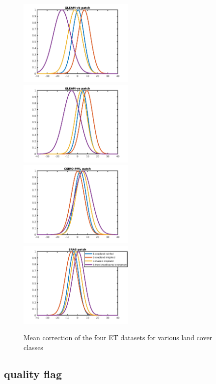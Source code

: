 \documentclass[draft]{agujournal2019}
\begin{document}
\begin{figure}[h]
\includegraphics[width=0.5\textwidth]{lcc_patch_1.png}
\includegraphics[width=0.5\textwidth]{lcc_patch_2.png}
\includegraphics[width=0.5\textwidth]{lcc_patch_3.png}
\includegraphics[width=0.5\textwidth]{lcc_patch_4.png}
\caption{Mean correction of the four ET datasets for various land cover classes}
\end{figure}


\subsection{quality flag}
\end{document}
